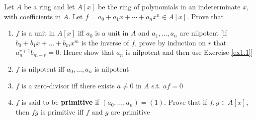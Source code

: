 \documentclass[11pt]{article}
\begin{document}
\begin{exercise}
\label{ex1.2}
Let \(A\) be a ring and let \(A[x]\) be the ring of polynomials in an indeterminate \(x\), with
coefficients in \(A\). Let \(f=a_0+a_1x+\cdots+a_nx^n\in A[x]\). Prove that
\begin{enumerate}
\item \(f\) is a unit in \(A[x]\) iff \(a_0\) is a unit in \(A\) and \(a_1,\dots,a_n\) are nilpotent [if
\(b_0+b_1x+\dots+b_mx^m\) is the inverse of \(f\), prove by induction on \(r\)
that \(a_n^{r+1}b_{m-r}=0\). Hence show that \(a_n\) is nilpotent and then use Exercise \ref{ex1.1}]
\item \(f\) is nilpotent iff \(a_0,\dots,a_n\) is nilpotent
\item \(f\) is a zero-divisor iff there exists \(a\neq 0\) in \(A\) s.t. \(af=0\)
\item \(f\) is said to be \textbf{primitive} if \((a_0,\dots,a_n)=(1)\). Prove that if \(f,g\in A[x]\),
then \(fg\) is primitive iff \(f\) and \(g\) are primitive
\end{enumerate}
\end{exercise}
\end{document}

